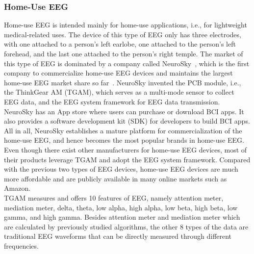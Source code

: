 \subsubsection{Home-Use EEG}
Home-use EEG is intended mainly for home-use applications, i.e., for lightweight medical-related uses. The device of this type of EEG only has three electrodes, with one attached to a person's left earlobe, one attached to the person's left forehead, and the last one attached to the person's right temple. %
The market of this type of EEG is dominated by a company called NeuroSky~\cite{NeuroSky}, which is the first company to commercialize home-use EEG devices and maintains the largest home-use EEG market share so far~\cite{firsthomeeeg,neuroskymarket}. NeuroSky invented the PCB module, i.e., the ThinkGear AM (TGAM), which serves as a multi-mode sensor to collect EEG data, and the  EEG system framework for EEG data transmission. NeuroSky has an App store where users can purchase or download BCI apps. It also provides a software development kit (SDK) for developers to build BCI apps. All in all, NeuroSky establishes a mature platform for commercialization of the home-use EEG, and hence becomes the most popular brands in home-use EEG. Even though there exist other manufacturers for home-use EEG devices, most of their products leverage TGAM and adopt the EEG system framework. Compared with the previous two types of EEG devices, home-use EEG devices are much more affordable and are publicly available in many online markets such as Amazon. \\
\indent TGAM measures and offers 10 features of EEG, namely attention meter, mediation meter, delta, theta, low alpha, high alpha, low beta, high beta, low gamma, and high gamma. Besides attention meter and mediation meter which are calculated by previously studied algorithms, the other 8 types of the data are traditional EEG waveforms that can be directly measured through different frequencies.
%
